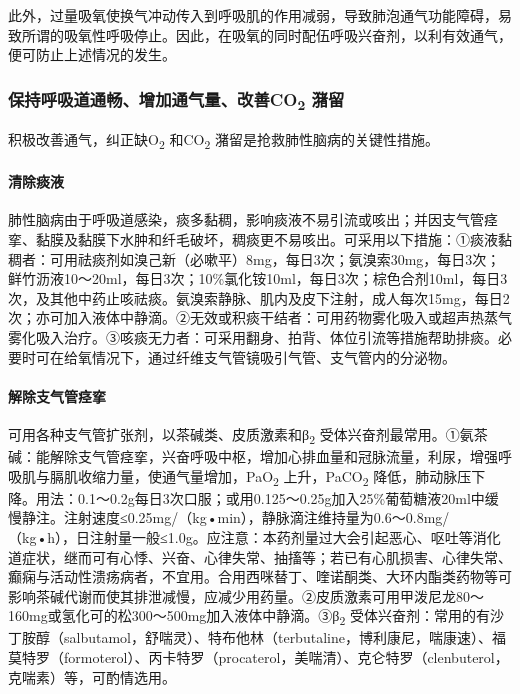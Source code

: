 此外，过量吸氧使换气冲动传入到呼吸肌的作用减弱，导致肺泡通气功能障碍，易致所谓的吸氧性呼吸停止。因此，在吸氧的同时配伍呼吸兴奋剂，以利有效通气，便可防止上述情况的发生。

\subsubsection{保持呼吸道通畅、增加通气量、改善CO\textsubscript{2} 潴留}

积极改善通气，纠正缺O\textsubscript{2} 和CO\textsubscript{2}
潴留是抢救肺性脑病的关键性措施。

\paragraph{清除痰液}

肺性脑病由于呼吸道感染，痰多黏稠，影响痰液不易引流或咳出；并因支气管痉挛、黏膜及黏膜下水肿和纤毛破坏，稠痰更不易咳出。可采用以下措施：①痰液黏稠者：可用祛痰剂如溴己新（必嗽平）8mg，每日3次；氨溴索30mg，每日3次；鲜竹沥液10～20ml，每日3次；10\%氯化铵10ml，每日3次；棕色合剂10ml，每日3次，及其他中药止咳祛痰。氨溴索静脉、肌内及皮下注射，成人每次15mg，每日2次；亦可加入液体中静滴。②无效或积痰干结者：可用药物雾化吸入或超声热蒸气雾化吸入治疗。③咳痰无力者：可采用翻身、拍背、体位引流等措施帮助排痰。必要时可在给氧情况下，通过纤维支气管镜吸引气管、支气管内的分泌物。

\paragraph{解除支气管痉挛}

可用各种支气管扩张剂，以茶碱类、皮质激素和β\textsubscript{2}
受体兴奋剂最常用。①氨茶碱：能解除支气管痉挛，兴奋呼吸中枢，增加心排血量和冠脉流量，利尿，增强呼吸肌与膈肌收缩力量，使通气量增加，PaO\textsubscript{2}
上升，PaCO\textsubscript{2}
降低，肺动脉压下降。用法：0.1～0.2g每日3次口服；或用0.125～0.25g加入25\%葡萄糖液20ml中缓慢静注。注射速度≤0.25mg/（kg•min），静脉滴注维持量为0.6～0.8mg/（kg•h），日注射量一般≤1.0g。应注意：本药剂量过大会引起恶心、呕吐等消化道症状，继而可有心悸、兴奋、心律失常、抽搐等；若已有心肌损害、心律失常、癫痫与活动性溃疡病者，不宜用。合用西咪替丁、喹诺酮类、大环内酯类药物等可影响茶碱代谢而使其排泄减慢，应减少用药量。②皮质激素可用甲泼尼龙80～160mg或氢化可的松300～500mg加入液体中静滴。③β\textsubscript{2}
受体兴奋剂：常用的有沙丁胺醇（salbutamol，舒喘灵）、特布他林（terbutaline，博利康尼，喘康速）、福莫特罗（formoterol）、丙卡特罗（procaterol，美喘清）、克仑特罗（clenbuterol，克喘素）等，可酌情选用。

